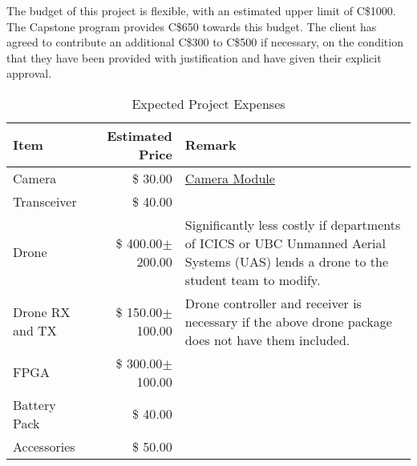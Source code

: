 The budget of this project is flexible, with an estimated upper limit of C\$1000. 
The Capstone program provides C\$650 towards this budget.
The client has agreed to contribute an additional C\$300 to C\$500 if necessary, on the condition that they have been provided with justification and have given their explicit approval.

\begin{table}[H]
    \centering
    \caption{Expected Project Expenses}
    \label{table:budget-items}

    \begin{tabular}{lrp{9cm}}

    \hline
    \textbf{Item} & \textbf{Estimated Price} & \textbf{Remark}\\
    \hline
    Camera&\$ \hfill30.00&\href{https://www.amazon.ca/Raspberry-Pi-Camera-Module-Megapixel/dp/B01ER2SKFS/ref=sr_1_3?crid=OOVX563QBZOF&keywords=raspberry+pi+camera&qid=1570511628&sprefix=raspbe\%2Caps\%2C238&sr=8-3}{Camera Module}\\
    Transceiver&\$ \hfill40.00&\\
    Drone&\$ \hfill400.00$\pm$200.00& Significantly less costly if departments of ICICS or UBC Unmanned Aerial Systems (UAS) lends a drone to the student team to modify.\\
    Drone RX and TX & \$ \hfill 150.00$\pm$100.00 & Drone controller and receiver is necessary if the above drone package does not have them included.\\
    FPGA&\$ \hfill 300.00$\pm$100.00&\\
    Battery Pack&\$ \hfill40.00&\\
    Accessories&\$ \hfill50.00&\\
    \hline

    \end{tabular} 
\end{table}
